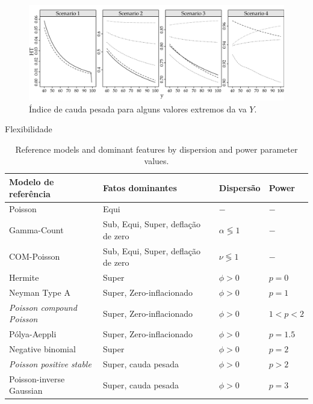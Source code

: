 \documentclass[10pt, aspectratio=169]{beamer}\usepackage[]{graphicx}\usepackage[]{color}
\begin{document}

\begin{frame}[fragile]
\begin{figure}[h]
\includegraphics[scale=0.6]{images/heavytail-1.png}
\caption{Índice de cauda pesada para alguns valores extremos da va $Y$.}
\label{Fig3}
\centering
\end{figure}
\end{frame}


\begin{frame}[fragile]{Flexibilidade}
\begin{table}[h]
\centering
\caption{Reference models and dominant features by dispersion and power parameter values.}
\label{tab:model}
\begin{tabular}{llll} \hline
Modelo de referência     & Fatos dominantes                     & Dispersão           & Power   \\ \hline
Poisson                  & Equi                                 & $-$          & $-$      \\
Gamma-Count              & Sub, Equi, Super, deflação de zero   & $\alpha \lessgtr 1$ & $-$ \\
COM-Poisson              & Sub, Equi, Super, deflação de zero   & $\nu \lessgtr 1$    & $-$ \\
Hermite                  & Super                                & $\phi > 0$    & $p = 0$   \\
Neyman Type A            & Super, Zero-inflacionado             & $\phi > 0$          & $p = 1$ \\
\textit{Poisson compound Poisson} & Super, Zero-inflacionado    & $\phi > 0$ & $1 < p < 2$ \\
P\'olya-Aeppli           & Super, Zero-inflacionado             & $\phi > 0$ & $p = 1.5$ \\
Negative binomial        & Super                                & $\phi > 0$ & $p = 2$ \\
\textit{Poisson positive stable}  & Super, cauda pesada         & $\phi > 0$       & $p > 2$ \\
Poisson-inverse Gaussian & Super, cauda pesada                  & $\phi > 0$       & $p = 3$ \\ \hline
\end{tabular}
\end{table}
\end{frame}
\end{document}
